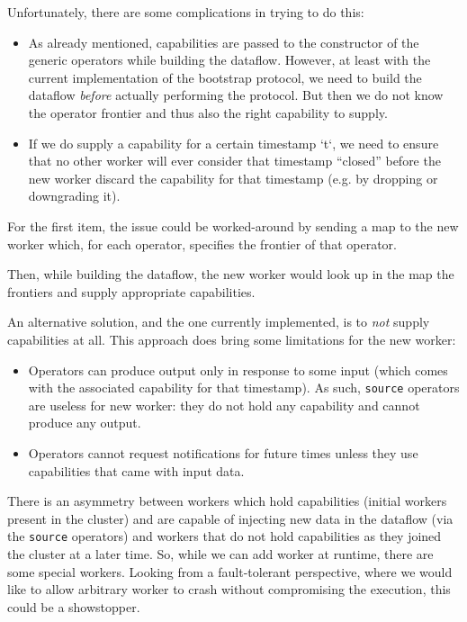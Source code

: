 \documentclass[12pt]{extarticle}
\begin{document}
Unfortunately, there are some complications in trying to do this:
\begin{itemize}
    \item As already mentioned, capabilities are passed to the constructor
        of the generic operators while building the dataflow. However, at least
        with the current implementation of the bootstrap protocol, we need to build
        the dataflow \textit{before} actually performing the protocol. But then
        we do not know the operator frontier and thus also the right capability to supply.

    \item If we do supply a capability for a certain timestamp `t`, we need to ensure
        that no other worker will ever consider that timestamp ``closed'' before the new
        worker discard the capability for that timestamp (e.g. by dropping or downgrading it).

\end{itemize}

For the first item, the issue could be worked-around by sending a map to the new
worker which, for each operator, specifies the frontier of that operator.

Then, while building the dataflow, the new worker would look up in the map the frontiers
and supply appropriate capabilities.

An alternative solution, and the one currently implemented, is to \textit{not} supply capabilities at all.
This approach does bring some limitations for the new worker:
\begin{itemize}
    \item Operators can produce output only in response to some input (which comes with the associated capability for that timestamp).
        As such, \verb|source| operators are useless for new worker: they do not hold any capability and cannot produce any output.
    \item Operators cannot request notifications for future times unless they use capabilities that came with input data.
\end{itemize}

There is an asymmetry between workers which hold capabilities (initial workers present in the cluster)
and are capable of injecting new data in the dataflow (via the \verb|source| operators) and workers
that do not hold capabilities as they joined the cluster at a later time. So, while we can add worker
at runtime, there are some special workers.
Looking from a fault-tolerant perspective, where we would like to allow arbitrary worker to crash without
compromising the execution, this could be a showstopper.
\end{document}
